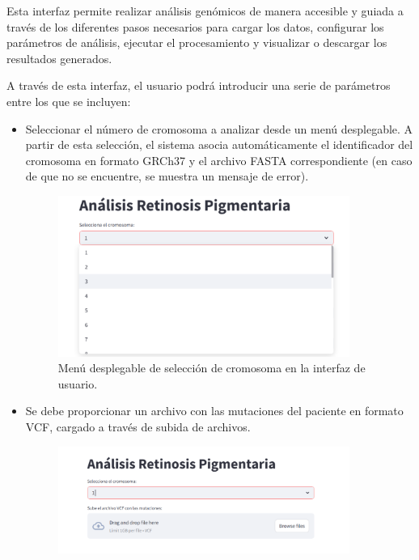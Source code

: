 \documentclass[11pt,spanish,listoffigures,listoftables]{tfgetsinf}
\begin{document}
Esta interfaz permite realizar análisis genómicos de manera accesible y guiada a través de los diferentes pasos necesarios para cargar los datos, configurar los parámetros de análisis, ejecutar el procesamiento y visualizar o descargar los resultados generados. 

 

A través de esta interfaz, el usuario podrá introducir una serie de parámetros entre los que se incluyen:  


\begin{itemize}
   \item Seleccionar el número de cromosoma a analizar desde un menú desplegable. A partir de esta selección, el sistema asocia automáticamente el identificador del cromosoma en formato GRCh37 y el archivo FASTA correspondiente (en caso de que no se encuentre, se muestra un mensaje de error). 
   \begin{figure}[H]
      \centering
      \includegraphics[width=0.9\textwidth]{cromosoma_RP.png}
      \caption{Menú desplegable de selección de cromosoma en la interfaz de usuario.}
      \label{fig:etiqueta_opcional6}
   \end{figure}
   \item Se debe proporcionar un archivo con las mutaciones del paciente en formato VCF, cargado a través de subida de archivos. 
   \begin{figure}[H]
      \centering
      \includegraphics[width=0.9\textwidth]{VCF_RP.png}

\end{figure}
\end{itemize}
\end{document}
